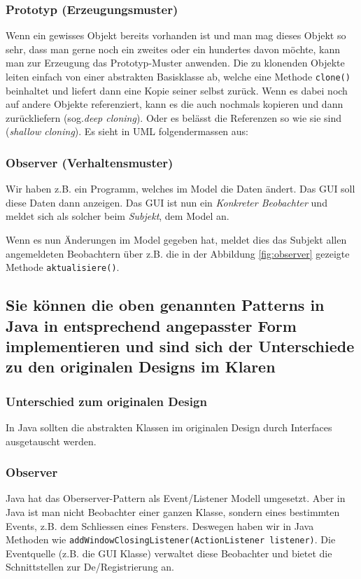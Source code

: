 \subsubsection{Prototyp (Erzeugungsmuster)} 
Wenn ein gewisses Objekt bereits vorhanden ist und man mag dieses Objekt so sehr, dass man gerne noch ein zweites oder ein hundertes davon möchte, kann man zur Erzeugung das Prototyp-Muster anwenden. 
Die zu klonenden Objekte leiten einfach von einer abstrakten Basisklasse ab, welche eine Methode \texttt{clone()} beinhaltet und liefert dann eine Kopie seiner selbst zurück. Wenn es dabei noch auf andere Objekte referenziert, kann es die auch nochmals kopieren und dann zurückliefern (sog.\emph{deep cloning}). Oder es belässt die Referenzen so wie sie sind (\emph{shallow cloning}). Es sieht in UML folgendermassen aus:


\newpage

\subsubsection{Observer (Verhaltensmuster)}
Wir haben z.B. ein Programm, welches im Model die Daten ändert. Das GUI soll diese Daten dann anzeigen. Das GUI ist nun ein \emph{Konkreter Beobachter} und meldet sich als solcher beim \emph{Subjekt}, dem Model an.

Wenn es nun Änderungen im Model gegeben hat, meldet dies das Subjekt allen angemeldeten Beobachtern über z.B. die in der Abbildung \ref{fig:observer} gezeigte Methode \texttt{aktualisiere()}.



\subsection{Sie können die oben genannten Patterns in Java in entsprechend angepasster Form implementieren und sind sich der Unterschiede zu den originalen Designs im Klaren}

\subsubsection{Unterschied zum originalen Design}
In Java sollten die abstrakten Klassen im originalen Design durch Interfaces ausgetauscht werden.

\subsubsection{Observer}
Java hat das Oberserver-Pattern als Event/Listener Modell umgesetzt. Aber in Java ist man nicht Beobachter einer ganzen Klasse, sondern eines bestimmten Events, z.B. dem Schliessen eines Fensters. Deswegen haben wir in Java Methoden wie \texttt{addWindowClosingListener(ActionListener listener)}. Die Eventquelle (z.B. die GUI Klasse) verwaltet diese Beobachter und bietet die Schnittstellen zur De/Registrierung an.

